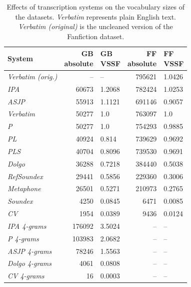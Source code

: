 \begin{table}
\caption{Effects of transcription systems on the vocabulary sizes of the datasets. \textit{Verbatim} represents plain English text. \textit{Verbatim (original)} is the uncleaned version of the Fanfiction dataset.}
\label{tab:system_characteristics}
\centering\small
\begin{tabular}{@{}l@{\hspace{1\tabcolsep}}rlrl@{}} %
\toprule
\bf System & \bf \specialcell{GB\\absolute} & \bf \specialcell{GB\\VSSF} & \bf \specialcell{FF\\absolute} & \bf \specialcell{FF\\VSSF} \\
\midrule
\textit{Verbatim (orig.)} & -- & -- & 795621 & 1.0426 \\
\textit{IPA} & 60673 & 1.2068 & 782424 & 1.0253 \\
\textit{ASJP} & 55913 & 1.1121 & 691146 & 0.9057 \\
\textit{Verbatim} & 50277 & 1.0 & 763097 & 1.0 \\
\textit{P} & 50277 & 1.0 & 754293 & 0.9885 \\
\textit{PL} & 40924 & 0.814 & 739629 & 0.9692 \\
\textit{PLS} & 40704 & 0.8096 & 739530 & 0.9691 \\
\textit{Dolgo} & 36288 & 0.7218 & 384440 & 0.5038 \\
\textit{RefSoundex} & 29441 & 0.5856 & 229360 & 0.3006 \\
\textit{Metaphone} & 26501 & 0.5271 & 210973 & 0.2765 \\
\textit{Soundex} & 4250 & 0.0845 & 6471 & 0.0085 \\
\textit{CV} & 1954 & 0.0389 & 9436 & 0.0124 \\
\textit{IPA 4-grams} & 176092 & 3.5024 & -- & -- \\
\textit{P 4-grams} & 103983 & 2.0682 & -- & -- \\
\textit{ASJP 4-grams} & 78246 & 1.5563 & -- & -- \\
\textit{Dolgo 4-grams} & 4061 & 0.0808 & -- & -- \\
\textit{CV 4-grams} & 16 & 0.0003 & -- & -- \\
\bottomrule
\end{tabular}
\end{table}
